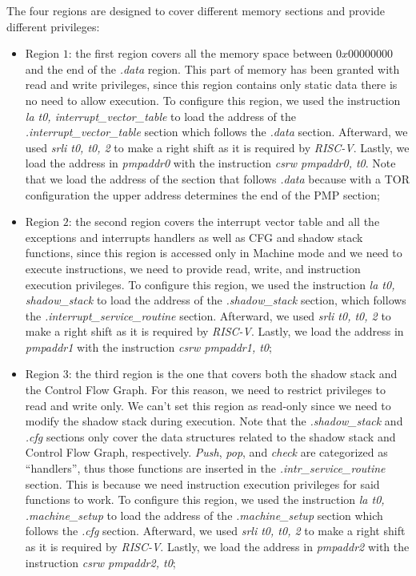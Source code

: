 The four regions are designed to cover different memory sections and provide
different privileges:
\begin{itemize}
  \item Region $1$: the first region covers all the memory space between
    $0x00000000$ and the end of the \textit{.data} region. This part of memory
    has been granted with read and write privileges, since this region contains only
    static data there is no need to allow execution. To configure this region, we
    used the instruction \textit{la t0, interrupt\_vector\_table} to load the
    address of the \textit{.interrupt\_vector\_table} section which follows the \textit{.data}
    section. Afterward, we used \textit{srli t0, t0, 2} to make a right shift as
    it is required by \textit{RISC-V}. Lastly, we load the address in \textit{pmpaddr0}
    with the instruction \textit{csrw pmpaddr0, t0}. Note that we load the address
    of the section that follows \textit{.data} because with a TOR configuration
    the upper address determines the end of the PMP section;

  \item Region $2$: the second region covers the interrupt vector table and all
    the exceptions and interrupts handlers as well as CFG and shadow stack
    functions, since this region is accessed only in Machine mode and we need to
    execute instructions, we need to provide read, write, and instruction
    execution privileges. To configure this region, we used the instruction
    \textit{la t0, shadow\_stack} to load the address of the \textit{.shadow\_stack}
    section, which follows the \textit{.interrupt\_service\_routine} section. Afterward,
    we used \textit{srli t0, t0, 2} to make a right shift as it is required by \textit{RISC-V}.
    Lastly, we load the address in \textit{pmpaddr1} with the instruction \textit{csrw
    pmpaddr1, t0};

  \item Region $3$: the third region is the one that covers both the shadow
    stack and the Control Flow Graph. For this reason, we need to restrict
    privileges to read and write only. We can't set this region as read-only since
    we need to modify the shadow stack during execution. Note that the \textit{.shadow\_stack}
    and \textit{.cfg} sections only cover the data structures related to the
    shadow stack and Control Flow Graph, respectively. \textit{Push}, \textit{pop},
    and \textit{check} are categorized as ``handlers'', thus those functions are
    inserted in the \textit{.intr\_service\_routine} section. This is because we
    need instruction execution privileges for said functions to work. To configure
    this region, we used the instruction \textit{la t0, .machine\_setup} to load
    the address of the \textit{.machine\_setup} section which follows the
    \textit{.cfg} section. Afterward, we used \textit{srli t0, t0, 2} to make a
    right shift as it is required by \textit{RISC-V}. Lastly, we load the address
    in \textit{pmpaddr2} with the instruction \textit{csrw pmpaddr2, t0};


\end{itemize}
